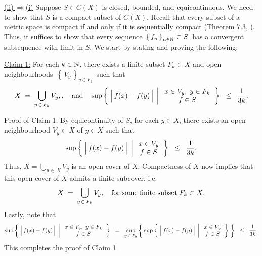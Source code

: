 \vskip 0.3cm
\noindent
\underline{(ii)\,\;$\Longrightarrow$\;(i)}
\vskip 0.1cm
\noindent
Suppose $S \in C(X)$ is closed, bounded, and equicontinuous.
We need to show that $S$ is a compact subset of $C(X)$.
Recall that every subset of a metric space is compact if and only if
it is sequentially compact (Theorem 7.3, \cite{Aliprantis1998}).
Thus, it suffices to show that every sequence
\,$\left\{\,f_{n}\,\right\}_{n\in\mathbb{N}} \subset S$\,
has a convergent subsequence with limit in $S$.
We start by stating and proving the following:

\vskip 0.3cm
\begin{center}
\begin{minipage}{6.0in}
\noindent
\underline{Claim 1:}
\vskip 0.1cm
\noindent
For each $k \in \mathbb{N}$, there exists a finite subset $F_{k} \subset X$ and
open neighbourhoods \,$\left\{\,V_{y}\,\right\}_{y \in F_{k}}$\, such that
\begin{equation*}
X \;=\; \bigcup_{y\,\in\,F_{k}}V_{y},,
\quad\textnormal{and}\quad
\sup\left\{\;
\left\vert\,\overset{{\color{white}.}}{f}(x) - f(y)\,\right\vert
\;\left\vert\;
\begin{array}{c} x \in V_{y}, \; y \in F_{k} \\ f \in S \end{array}
\right.\right\}
\;\; \leq \;\; \dfrac{1}{3k}.
\end{equation*}
\end{minipage}
\end{center}
Proof of Claim 1:\; By equicontinuity of $S$, for each $y \in X$,
there exists an open neighbourhood $V_{y} \subset X$ of $y \in X$
such that
\begin{equation*}
\sup\left\{\;
\left\vert\,\overset{{\color{white}.}}{f}(x) - f(y)\,\right\vert
\;\left\vert\;
\begin{array}{c} x \in V_{y} \\ f \in S \end{array}
\right.\right\}
\;\; \leq \;\; \dfrac{1}{3k}.
\end{equation*}
Thus, $X = \underset{y\,\in\,X}{\bigcup}V_{y}$ is an open cover of $X$.
Compactness of $X$ now implies that this open cover of $X$ admits a finite subcover, i.e.
\begin{equation*}
X \; = \; \bigcup_{y\,\in\,F_{k}}V_{y},
\quad
\textnormal{for some finite subset $F_{k} \subset X$}.
\end{equation*}
Lastly, note that
\begin{equation*}
\sup\left\{\;
\left\vert\,\overset{{\color{white}.}}{f}(x) - f(y)\,\right\vert
\;\left\vert\;
\begin{array}{c} x \in V_{y}, \; y \in F_{k} \\ f \in S \end{array}
\right.\right\}
\;\; = \;\;
\sup_{y\,\in\,F_{k}}
\left\{\;
\sup\left\{\;
\left\vert\,\overset{{\color{white}.}}{f}(x) - f(y)\,\right\vert
\;\left\vert\;
\begin{array}{c} x \in V_{y} \\ f \in S \end{array}
\right.\right\}
\;\right\}
\;\; \leq \;\; \dfrac{1}{3k}.
\end{equation*}
This completes the proof of Claim 1.

